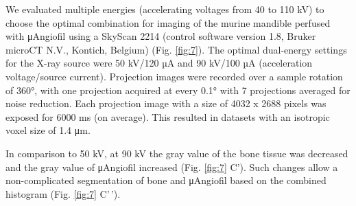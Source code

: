 We evaluated multiple energies (accelerating voltages from 40 to 110 kV) to choose the optimal combination for imaging of the murine mandible perfused with μAngiofil using a SkyScan 2214 (control software version 1.8, Bruker microCT N.V., Kontich, Belgium) (Fig. \ref{fig:7}).
The optimal dual-energy settings for the X-ray source were 50 kV/120 µA and 90 kV/100 µA (acceleration voltage/source current).
Projection images were recorded over a sample rotation of 360°, with one projection acquired at every 0.1° with 7 projections averaged for noise reduction.
Each projection image with a size of 4032 x 2688 pixels was exposed for 6000 ms (on average).
This resulted in datasets with an isotropic voxel size of 1.4 μm.

In comparison to 50 kV, at 90 kV the gray value of the bone tissue was decreased and the gray value of μAngiofil increased (Fig. \ref{fig:7} C').
Such changes allow a non-complicated segmentation of bone and μAngiofil based on the combined histogram (Fig. \ref{fig:7} C'\,').

